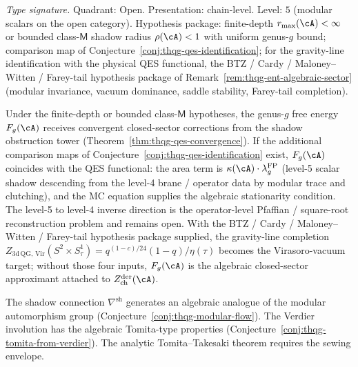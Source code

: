 \begin{conjecture}
\ClaimStatusConjectured
\label{conj:thqg-g12-target}
\textit{Type signature.}
Quadrant: Open. Presentation: chain-level. Level: $5$ (modular
scalars on the open category).
Hypothesis package: finite-depth $r_{\max}(\cA) < \infty$ or bounded
class-$\mathsf{M}$ shadow radius $\rho(\cA) < 1$ with uniform genus-$g$
bound; comparison map of
Conjecture~\ref{conj:thqg-qes-identification}; for the gravity-line
identification with the physical QES functional, the BTZ / Cardy /
Maloney--Witten / Farey-tail hypothesis package of
Remark~\ref{rem:thqg-ent-algebraic-sector}
\textup{(}modular invariance, vacuum dominance, saddle stability,
Farey-tail completion\textup{)}.

\medskip
Under the finite-depth or bounded class-$\mathsf M$ hypotheses,
the genus-$g$ free energy $F_g(\cA)$ receives convergent
closed-sector corrections from the shadow obstruction tower
(Theorem~\ref{thm:thqg-qes-convergence}).
If the additional comparison maps of
Conjecture~\ref{conj:thqg-qes-identification} exist, $F_g(\cA)$
coincides with the QES functional:
the area term is $\kappa(\cA) \cdot \lambda_g^{\mathrm{FP}}$
(level-5 scalar shadow descending from the level-4 brane / operator
data by modular trace and clutching), and the MC equation supplies
the algebraic stationarity condition. The level-5 to level-4 inverse
direction is the operator-level Pfaffian / square-root reconstruction
problem and remains open. With the BTZ / Cardy / Maloney--Witten /
Farey-tail hypothesis package supplied, the gravity-line completion
$Z_{\mathrm{3d\,QG,\,Vir}}(S^2 \times S^1_\tau) =
q^{(1-c)/24}(1-q)/\eta(\tau)$ becomes the Virasoro-vacuum target;
without those four inputs, $F_g(\cA)$ is the algebraic closed-sector
approximant attached to $Z^{\mathrm{der}}_{\mathrm{ch}}(\cA)$.
\end{conjecture}

\begin{conjecture}
\ClaimStatusConjectured
\label{conj:thqg-g13-target}
The shadow connection $\nabla^{\mathrm{sh}}$ generates
an algebraic analogue of the modular automorphism group
(Conjecture~\ref{conj:thqg-modular-flow}).
The Verdier involution has the algebraic Tomita-type properties
(Conjecture~\ref{conj:thqg-tomita-from-verdier}).
The analytic Tomita--Takesaki theorem requires the sewing envelope.
\end{conjecture}

